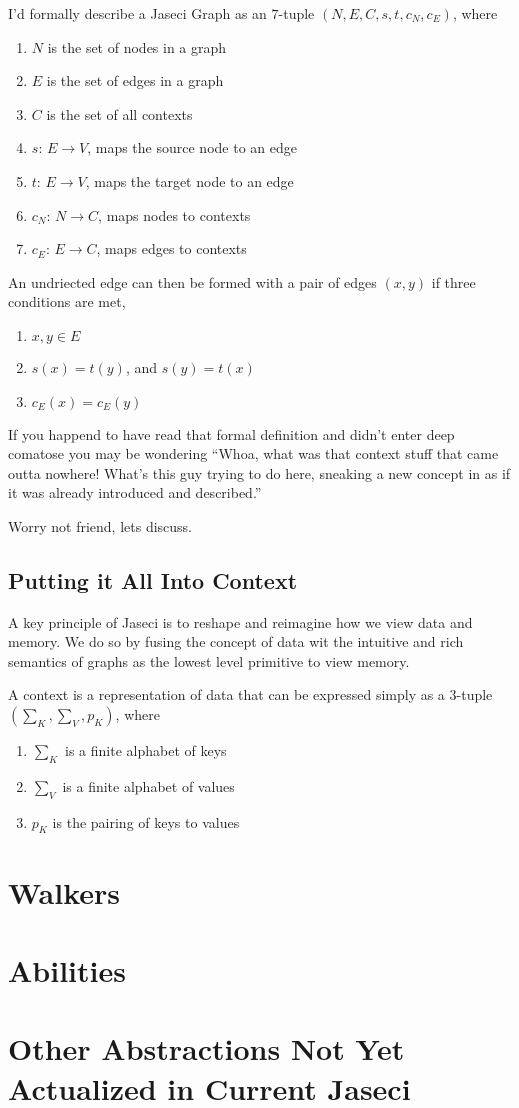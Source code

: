 \begin{nerd}
    I'd formally describe a Jaseci Graph as an $7$-tuple $(N,E,C,s,t,c_N,c_E)$, where
    \begin{enumerate}
        \item $N$ is the set of nodes in a graph
        \item $E$ is the set of edges in a graph
        \item $C$ is the set of all contexts
        \item $s$: $E \rightarrow V$, maps the source node to an edge
        \item $t$: $E \rightarrow V$,  maps the target node to an edge
        \item $c_N$: $N \rightarrow C$, maps nodes to contexts
        \item $c_E$: $E \rightarrow C$, maps edges to contexts
    \end{enumerate}
    An undriected edge can then be formed with a pair of edges $(x, y)$ if three conditions are met,
    \begin{enumerate}
        \item $x, y \in E$
        \item $s(x) = t(y)$, and $s(y) = t(x)$
        \item $c_E(x) = c_E(y)$
    \end{enumerate}
\end{nerd}
\par
If you happend to have read that formal definition and didn't enter deep comatose you may be wondering ``Whoa, what was that context stuff that came outta nowhere! What's this guy trying to do here, sneaking a new concept in as if it was already introduced and described.''
\par
Worry not friend, lets discuss.
\subsection{Putting it All Into Context}

A key principle of Jaseci is to reshape and reimagine how we view data and memory. We do so by fusing the concept of data wit the intuitive and rich semantics of graphs as the lowest level primitive to view memory.

\begin{nerd}
    A context is a representation of data that can be expressed simply as a $3$-tuple $(\sum_K,\sum_V,p_K)$, where
    \begin{enumerate}
        \item $\sum_K$ is a finite alphabet of keys
        \item $\sum_V$ is a finite alphabet of values
        \item $p_K$ is the pairing of keys to values
    \end{enumerate}
\end{nerd}
\section{Walkers}
\section{Abilities}
\section{Other Abstractions Not Yet Actualized in Current Jaseci}
